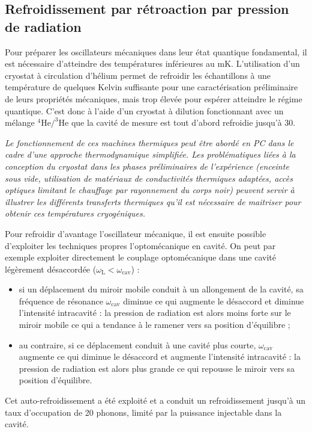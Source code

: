 \documentclass[12pt,a4paper]{article}
\begin{document}
\subsection{Refroidissement par rétroaction par pression de radiation}

Pour préparer les oscillateurs mécaniques dans leur état quantique fondamental, il est nécessaire d'atteindre des températures inférieures au mK.
L'utilisation d'un cryostat à circulation d'hélium permet de refroidir les échantillons à une température de quelques Kelvin suffisante pour une caractérisation préliminaire de leurs propriétés mécaniques, mais trop élevée pour espérer atteindre le régime quantique.
C'est donc à l'aide d'un cryostat à dilution fonctionnant avec un mélange $\mathrm{^4He/^3He}$ que la cavité de mesure est tout d'abord refroidie jusqu'à \unit{30}{\milli\kelvin}.

\textit{Le fonctionnement de ces machines thermiques peut être abordé en PC dans le cadre d'une approche thermodynamique simplifiée.
Les problématiques liées à la conception du cryostat dans les phases préliminaires de l'expérience (enceinte sous vide, utilisation de matériaux de conductivités thermiques adaptées, accès optiques limitant le chauffage par rayonnement du corps noir) peuvent servir à illustrer les différents transferts thermiques qu'il est nécessaire de maitriser pour obtenir ces températures cryogéniques.}

Pour refroidir d'avantage l'oscillateur mécanique, il est ensuite possible d'exploiter les techniques propres l'optomécanique en cavité.
On peut par exemple exploiter directement le couplage optomécanique dans une cavité légèrement désaccordée ($\omega_\mathrm{L}<\omega_\mathrm{cav}$) :
\begin{itemize}
\item si un déplacement du miroir mobile conduit à un allongement de la cavité, sa fréquence de résonance $\omega_\mathrm{cav}$ diminue ce qui augmente le désaccord et diminue l'intensité intracavité : la pression de radiation est alors moins forte sur le miroir mobile ce qui a tendance à le ramener vers sa position d'équilibre ;
\item au contraire, si ce déplacement conduit à une cavité plus courte, $\omega_\mathrm{cav}$ augmente ce qui diminue le désaccord et augmente l'intensité intracavité : la pression de radiation est alors plus grande ce qui repousse le miroir vers sa position d'équilibre.
\end{itemize}
Cet auto-refroidissement a été exploité et a conduit un refroidissement jusqu'à un taux d'occupation de 20 phonons, limité par la puissance injectable dans la cavité.
\end{document}
